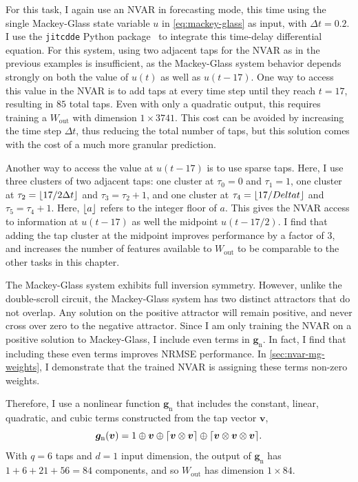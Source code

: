 For this task, I again use an NVAR in forecasting mode, this time
using the single Mackey-Glass state variable $u$ in
\cref{eq:mackey-glass} as input, with $\Delta t = 0.2$. I use the
\texttt{jitcdde} Python package~\cite{ansmann2018} to integrate this
time-delay differential equation. For this system, using two adjacent
taps for the NVAR as in the previous examples is insufficient, as the
Mackey-Glass system behavior depends strongly on both the value of
$u(t)$ as well as $u(t - 17)$. One way to access this value in the
NVAR is to add taps at every time step until they reach $t = 17$,
resulting in $85$ total taps. Even with only a quadratic output, this
requires training a $W_\text{out}$ with dimension $1 \times
3741$. This cost can be avoided by increasing the time step $\Delta
t$, thus reducing the total number of taps, but this solution comes
with the cost of a much more granular prediction.

Another way to access the value at $u(t-17)$ is to use sparse
taps. Here, I use three clusters of two adjacent taps: one cluster at
$\tau_0 = 0$ and $\tau_1 = 1$, one cluster at $\tau_2 = \lfloor17 / 2
  \Delta t\rfloor$ and $\tau_3 = \tau_2 + 1$, and one cluster at $\tau_4 =
\lfloor17 / Delta t\rfloor$ and $\tau_5 = \tau_4 + 1$. Here, $\lfloor a\rfloor$ refers to the integer floor of $a$. This gives the NVAR
access to information at $u(t - 17)$ as well the midpoint $u(t -
17/2)$. I find that adding the tap cluster at the midpoint improves performance
by a factor of $3$, and increases the number of features available to
$W_\text{out}$ to be comparable to the other tasks in this chapter.

The Mackey-Glass system exhibits full inversion symmetry. However,
unlike the double-scroll circuit, the Mackey-Glass system has two
distinct attractors that do not overlap. Any solution on the positive
attractor will remain positive, and never cross over zero to the
negative attractor. Since I am only training the NVAR on a positive
solution to Mackey-Glass, I include even terms in $\bm{g}_\text{n}$. In
fact, I find that including these even terms improves NRMSE
performance. In \cref{sec:nvar-mg-weights}, I demonstrate that the trained NVAR is assigning these terms non-zero weights.

Therefore, I use a nonlinear function
$\bm{g}_\text{n}$ that includes the constant, linear, quadratic, and
cubic terms constructed from the tap vector $\bm{v}$,
\begin{equation}
  \bm{g}_\text{n}(\bm{v}) = 1 \oplus \bm{v} \oplus \lceil\bm{v} \otimes \bm{v}\rceil \oplus \lceil\bm{v} \otimes \bm{v} \otimes \bm{v}\rceil.
\end{equation}
With $q = 6$ taps and $d = 1$ input dimension, the output of $\bm{g}_\text{n}$
has $1 + 6 + 21 + 56 = 84$ components, and so $W_\text{out}$ has
dimension $1 \times 84$.


